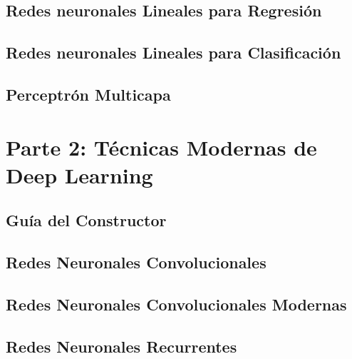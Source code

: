 \documentclass[
]{book}
\begin{document}
\hypertarget{redes-neuronales-lineales-para-regresiuxf3n}{%
\chapter{Redes neuronales Lineales para Regresión}\label{redes-neuronales-lineales-para-regresiuxf3n}}

\hypertarget{redes-neuronales-lineales-para-clasificaciuxf3n}{%
\chapter{Redes neuronales Lineales para Clasificación}\label{redes-neuronales-lineales-para-clasificaciuxf3n}}

\hypertarget{perceptruxf3n-multicapa}{%
\chapter{Perceptrón Multicapa}\label{perceptruxf3n-multicapa}}

\hypertarget{part-parte-2-tuxe9cnicas-modernas-de-deep-learning}{%
\part*{Parte 2: Técnicas Modernas de Deep Learning}\label{part-parte-2-tuxe9cnicas-modernas-de-deep-learning}}

\hypertarget{guuxeda-del-constructor}{%
\chapter{Guía del Constructor}\label{guuxeda-del-constructor}}

\hypertarget{redes-neuronales-convolucionales}{%
\chapter{Redes Neuronales Convolucionales}\label{redes-neuronales-convolucionales}}

\hypertarget{redes-neuronales-convolucionales-modernas}{%
\chapter{Redes Neuronales Convolucionales Modernas}\label{redes-neuronales-convolucionales-modernas}}

\hypertarget{redes-neuronales-recurrentes}{%
\chapter{Redes Neuronales Recurrentes}\label{redes-neuronales-recurrentes}}
\end{document}
